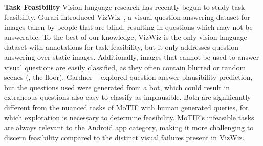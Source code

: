 \noindent\textbf{Task Feasibility}
Vision-language research has recently begun to study task feasibility. Gurari \etal\hspace{0.25mm} introduced VizWiz~\cite{vizwiz}, a visual question answering dataset for images taken by people that are blind, resulting in questions which may not be answerable. To the best of our knowledge, VizWiz is the only vision-language dataset with annotations for task feasibility, but it only addresses question answering over static images. Additionally, images that cannot be used to answer visual questions are easily classified, as they often contain blurred or random scenes (\eg, the floor). 
Gardner \etal ~\cite{Gardner2020DeterminingQP} explored question-answer plausibility prediction, but the questions used were generated from a bot, which could result in extraneous questions also easy to classify as implausible. Both are significantly different from the nuanced tasks of MoTIF with human generated queries, for which exploration is necessary to determine feasibility. MoTIF's infeasible tasks are always relevant to the Android app category, making it more challenging to discern feasibility compared to the distinct visual failures present in VizWiz. %
\smallskip
